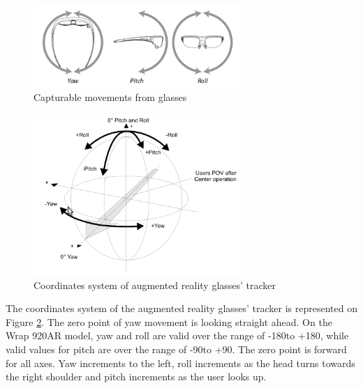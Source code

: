 \documentclass[msc, a4paper, classic, en]{ufbathesis}
\begin{document}
\begin{figure}
\centering
\includegraphics[width=0.7\textwidth]{images/glasses1.png}
\caption{Capturable movements from glasses \cite{vuzixsdk}}
\label{fig:glasses1}
\end{figure}

\begin{figure}
\centering
\includegraphics[width=0.7\textwidth]{images/glasses2.png}
\caption{Coordinates system of augmented reality glasses' tracker \cite{vuzixsdk}}
\label{fig:glasses2}
\end{figure}

The coordinates system of the augmented reality glasses' tracker is represented on Figure \ref{fig:glasses2}. The zero point of yaw movement is looking straight ahead. On the Wrap 920AR model, yaw and roll are valid over the range of -180\degree to +180\degree, while valid values for pitch are over the range of -90\degree to +90\degree. The zero point is forward for all axes. Yaw increments to the left, roll increments as the head turns towards the right shoulder and pitch increments as the user looks up.
\end{document}
